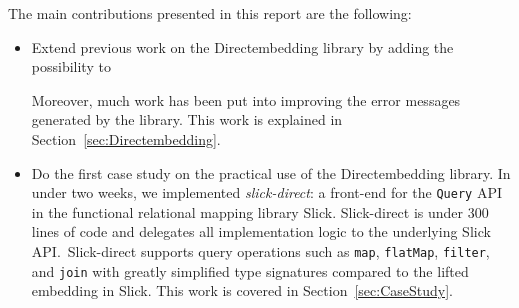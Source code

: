 \documentclass[11pt,a4paper]{article}
\begin{document}
The main contributions presented in this report are the following:
\begin{itemize}
    \item Extend previous work on the Directembedding library by adding the possibility to
        Moreover, much work has been put into improving the error messages generated by the library.
        This work is explained in Section~\ref{sec:Directembedding}.
    \item Do the first case study on the practical use of the Directembedding library.
        In under two weeks, we implemented \emph{slick-direct}: a front-end for the \texttt{Query} API in the functional relational mapping library Slick.
        Slick-direct is under 300 lines of code and delegates all implementation logic to the underlying Slick API.\
        Slick-direct supports query operations such as \texttt{map}, \texttt{flatMap}, \texttt{filter}, and \texttt{join} with greatly simplified type signatures compared to the lifted embedding in Slick.
        This work is covered in Section~\ref{sec:CaseStudy}.
\end{itemize}






\printbibliography{}
\end{document}
